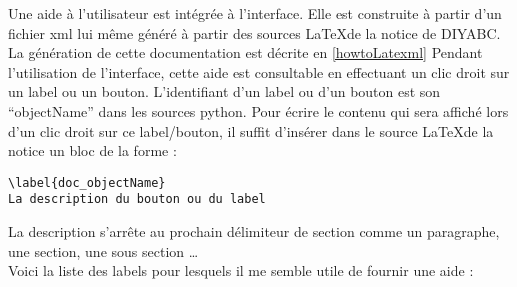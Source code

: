 \documentclass[12pt,a4paper]{article}
\begin{document}
    Une aide à l'utilisateur est intégrée à l'interface. Elle est construite à
    partir d'un fichier xml lui même généré à partir des sources \LaTeX de la
    notice de DIYABC. La génération de cette documentation est décrite en 
    \ref{howtoLatexml}
    Pendant l'utilisation de l'interface, cette aide est
    consultable en effectuant un clic droit sur un label ou un bouton.
    L'identifiant d'un label ou d'un bouton est son ``objectName'' dans les
    sources python. Pour écrire le contenu qui sera affiché lors d'un clic droit
    sur ce label/bouton, il suffit d'insérer dans le source \LaTeX de la notice
    un bloc de la forme : 
    \begin{verbatim}\label{doc_objectName}
La description du bouton ou du label\end{verbatim}
    La description s'arrête au prochain délimiteur de section comme un
    paragraphe, une section, une sous section \ldots \\

    Voici la liste des labels pour lesquels il me semble utile de fournir une
    aide :\\
\end{document}
